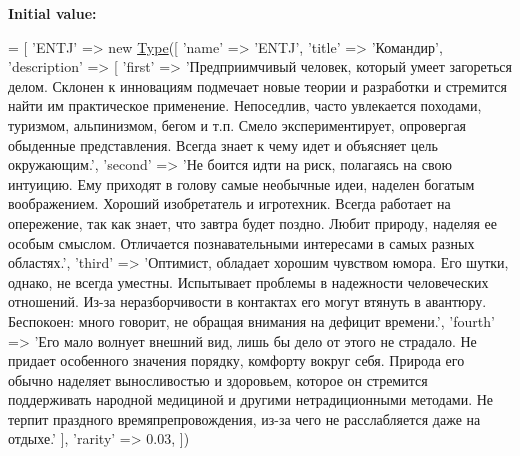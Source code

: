 {\bfseries Initial value\+:}
\begin{DoxyCode}
= [
    \textcolor{stringliteral}{'ENTJ'} => \textcolor{keyword}{new} \hyperlink{class_classes_1_1_types_1_1_type}{Type}([
        \textcolor{stringliteral}{'name'} => \textcolor{stringliteral}{'ENTJ'},
        \textcolor{stringliteral}{'title'} => \textcolor{stringliteral}{'Командир'},
        \textcolor{stringliteral}{'description'} => [
            \textcolor{stringliteral}{'first'} => \textcolor{stringliteral}{'Предприимчивый человек, который умеет загореться делом. Склонен к инновациям
       подмечает новые теории и разработки и стремится найти им практическое применение. Непоседлив, часто увлекается
       походами, туризмом, альпинизмом, бегом и т.п. Смело экспериментирует, опровергая обыденные представления.
       Всегда знает к чему идет и объясняет цель окружающим.'},
            \textcolor{stringliteral}{'second'} => \textcolor{stringliteral}{'Не боится идти на риск, полагаясь на свою интуицию. Ему приходят в голову самые
       необычные идеи, наделен богатым воображением. Хороший изобретатель и игротехник. Всегда работает на
       опережение, так как знает, что завтра будет поздно. Любит природу, наделяя ее особым смыслом. Отличается
       познавательными интересами в самых разных областях.'},
            \textcolor{stringliteral}{'third'} => \textcolor{stringliteral}{'Оптимист, обладает хорошим чувством юмора. Его шутки, однако, не всегда уместны.
       Испытывает проблемы в надежности человеческих отношений. Из-за неразборчивости в контактах его могут втянуть в
       авантюру. Беспокоен: много говорит, не обращая внимания на дефицит времени.'},
            \textcolor{stringliteral}{'fourth'} => \textcolor{stringliteral}{'Его мало волнует внешний вид, лишь бы дело от этого не страдало. Не придает
       особенного значения порядку, комфорту вокруг себя. Природа его обычно наделяет выносливостью и здоровьем, которое
       он стремится поддерживать народной медициной и другими нетрадиционными методами. Не терпит праздного
       времяпрепровождения, из-за чего не расслабляется даже на отдыхе.'}
        ],
        \textcolor{stringliteral}{'rarity'} => 0.03,
        ])
\end{DoxyCode}
